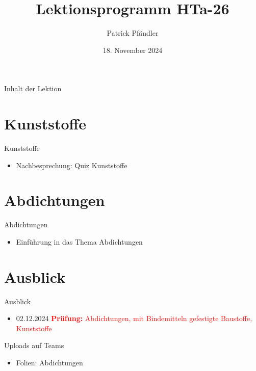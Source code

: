 



\title{\textbf{Lektionsprogramm HTa-26}}
\author{Patrick Pfändler}
\date{18. November 2024}




\frame{\titlepage}

\begin{frame}{Inhalt der Lektion}
    \tableofcontents
\end{frame}





\section{Kunststoffe}
\begin{frame}{Kunststoffe}
    \begin{itemize}
        \item Nachbesprechung: Quiz Kunststoffe
    \end{itemize}
\end{frame}

\section{Abdichtungen}
\begin{frame}{Abdichtungen}
    \begin{itemize}
        \item Einführung in das Thema Abdichtungen
    \end{itemize}
\end{frame}





\section{Ausblick}
\begin{frame}{Ausblick}
	\begin{itemize}
		\item 02.12.2024 \textcolor{red}{\textbf{Prüfung:} Abdichtungen, mit Bindemitteln gefestigte Baustoffe, Kunststoffe}
	\end{itemize}
\end{frame}

\begin{frame}{Uploads auf Teams}
    \begin{itemize}
        \item[\textbullet] Folien: Abdichtungen
    \end{itemize}
    
\end{frame}

\folieFragen

